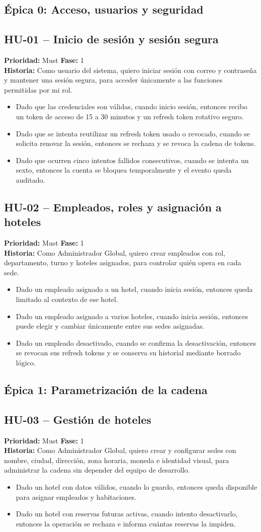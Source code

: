 \documentclass[12pt,a4paper]{article}
\newcommand{\HU}[5]{%
  \subsection*{#1 -- #2}
  \noindent\textbf{Prioridad:} #3 \hfill \textbf{Fase:} #4\\
  \noindent\textbf{Historia:} #5
  \vspace{2mm}
}
\begin{document}
\subsection{Épica 0: Acceso, usuarios y seguridad}

\HU{HU-01}{Inicio de sesión y sesión segura}{Must}{1}{Como usuario del sistema, quiero iniciar sesión con correo y contraseña y mantener una sesión segura, para acceder únicamente a las funciones permitidas por mi rol.}
\begin{itemize}
  \item Dado que las credenciales son válidas, cuando inicio sesión, entonces recibo un token de acceso de 15 a 30 minutos y un refresh token rotativo seguro.
  \item Dado que se intenta reutilizar un refresh token usado o revocado, cuando se solicita renovar la sesión, entonces se rechaza y se revoca la cadena de tokens.
  \item Dado que ocurren cinco intentos fallidos consecutivos, cuando se intenta un sexto, entonces la cuenta se bloquea temporalmente y el evento queda auditado.
\end{itemize}

\HU{HU-02}{Empleados, roles y asignación a hoteles}{Must}{1}{Como Administrador Global, quiero crear empleados con rol, departamento, turno y hoteles asignados, para controlar quién opera en cada sede.}
\begin{itemize}
  \item Dado un empleado asignado a un hotel, cuando inicia sesión, entonces queda limitado al contexto de ese hotel.
  \item Dado un empleado asignado a varios hoteles, cuando inicia sesión, entonces puede elegir y cambiar únicamente entre sus sedes asignadas.
  \item Dado un empleado desactivado, cuando se confirma la desactivación, entonces se revocan sus refresh tokens y se conserva su historial mediante borrado lógico.
\end{itemize}

\subsection{Épica 1: Parametrización de la cadena}

\HU{HU-03}{Gestión de hoteles}{Must}{1}{Como Administrador Global, quiero crear y configurar sedes con nombre, ciudad, dirección, zona horaria, moneda e identidad visual, para administrar la cadena sin depender del equipo de desarrollo.}
\begin{itemize}
  \item Dado un hotel con datos válidos, cuando lo guardo, entonces queda disponible para asignar empleados y habitaciones.
  \item Dado un hotel con reservas futuras activas, cuando intento desactivarlo, entonces la operación se rechaza e informa cuántas reservas la impiden.
\end{itemize}
\end{document}
